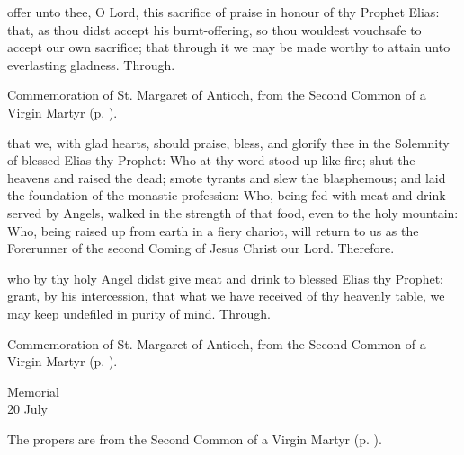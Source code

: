 \secret
{} offer unto thee, O Lord, this sacrifice of praise in honour of thy Prophet Elias: that, as thou didst accept his burnt-offering, so thou wouldest vouchsafe to accept our own sacrifice; that through it we may be made worthy to attain unto everlasting gladness. Through.
\begin{rubric}
	Commemoration of St. Margaret of Antioch, from the Second Common of a Virgin Martyr (p. \pageref{CommonVirginMartyrII}).
\end{rubric}

 that we, with glad hearts, should praise, bless, and glorify thee in the Solemnity of blessed Elias thy Prophet: Who at thy word stood up like fire; shut the heavens and raised the dead; smote tyrants and slew the blasphemous; and laid the foundation of the monastic profession: Who, being fed with meat and drink served by Angels, walked in the strength of that food, even to the holy mountain: Who, being raised up from earth in a fiery chariot, will return to us as the Forerunner of the second Coming of Jesus Christ our Lord. Therefore.


\postcommunion
{} who by thy holy Angel didst give meat and drink to blessed Elias thy Prophet: grant, by his intercession, that what we have received of thy heavenly table, we may keep undefiled in purity of mind. Through.
\begin{rubric}
	Commemoration of St. Margaret of Antioch, from the Second Common of a Virgin Martyr (p. \pageref{CommonVirginMartyrII}).
\end{rubric}


\begin{inhead}
    {Memorial\\
20 July}
\end{inhead}

\begin{rubric}
	The propers are from the Second Common of a Virgin Martyr (p. \pageref{CommonVirginMartyrII}).
\end{rubric}


